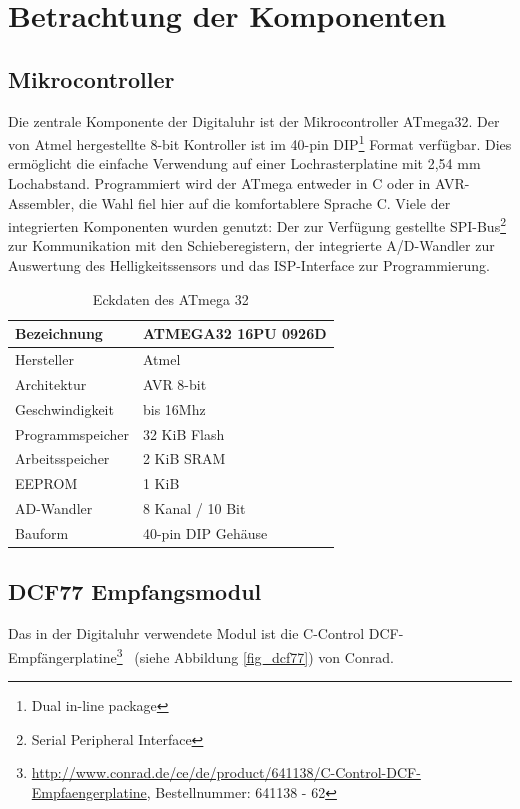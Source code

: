 \section{Betrachtung der Komponenten}
\subsection{Mikrocontroller}
Die zentrale Komponente der Digitaluhr ist der Mikrocontroller ATmega32. Der von Atmel hergestellte 8-bit Kontroller ist im 40-pin DIP\footnote{Dual in-line package} Format verfügbar. Dies ermöglicht die einfache Verwendung auf einer Lochrasterplatine mit 2,54 mm Lochabstand. Programmiert wird der ATmega entweder in C oder in AVR-Assembler, die Wahl fiel hier auf die komfortablere Sprache C.
Viele der integrierten Komponenten wurden genutzt: Der zur Verfügung gestellte SPI-Bus\footnote{Serial Peripheral Interface} zur Kommunikation mit den Schieberegistern, der integrierte A/D-Wandler zur Auswertung des Helligkeitssensors und das ISP-Interface zur Programmierung.
\begin{table}[htp]
  \centering
  \renewcommand{\arraystretch}{1.2}
  \begin{tabular}{||l | l||}
  \hline\hline
  Bezeichnung&ATMEGA32 16PU 0926D\\\hline
  Hersteller&Atmel\\\hline
  Architektur&AVR 8-bit \\\hline
  Geschwindigkeit&bis 16Mhz \\\hline
  Programmspeicher&32 KiB Flash \\\hline
  Arbeitsspeicher&2 KiB SRAM \\\hline
  EEPROM&1 KiB \\\hline
  AD-Wandler&8 Kanal / 10 Bit \\\hline
  Bauform&40-pin DIP Gehäuse \\
  \hline\hline    
\end{tabular}
\caption{Eckdaten des ATmega 32}
\end{table}

\subsection{DCF77 Empfangsmodul}\label{sec_dcf77modul}
Das in der Digitaluhr verwendete Modul ist die \glqq C-Control DCF-Empfängerplatine\grqq\footnote{\url{http://www.conrad.de/ce/de/product/641138/C-Control-DCF-Empfaengerplatine}, Bestellnummer: 641138 - 62}~ (siehe Abbildung \ref{fig_dcf77}) von Conrad.

